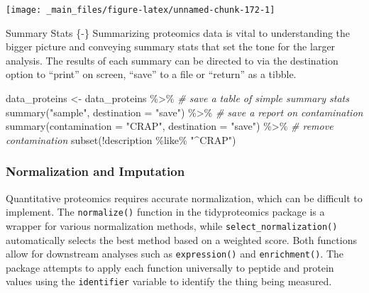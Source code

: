 \documentclass[
]{book}
\newenvironment{Shaded}{\begin{snugshade}}{\end{snugshade}}
\newcommand{\AttributeTok}[1]{\textcolor[rgb]{0.77,0.63,0.00}{#1}}
\newcommand{\CommentTok}[1]{\textcolor[rgb]{0.56,0.35,0.01}{\textit{#1}}}
\newcommand{\FunctionTok}[1]{\textcolor[rgb]{0.00,0.00,0.00}{#1}}
\newcommand{\NormalTok}[1]{#1}
\newcommand{\OtherTok}[1]{\textcolor[rgb]{0.56,0.35,0.01}{#1}}
\newcommand{\SpecialCharTok}[1]{\textcolor[rgb]{0.00,0.00,0.00}{#1}}
\newcommand{\StringTok}[1]{\textcolor[rgb]{0.31,0.60,0.02}{#1}}
\begin{document}
\begin{center}\texttt{[image: \_main\_files/figure-latex/unnamed-chunk-172-1]} \end{center}

Summary Stats \{-\}
Summarizing proteomics data is vital to understanding the bigger picture and conveying summary stats that set the tone for the larger analysis. The results of each summary can be directed to via the destination option to ``print'' on screen, ``save'' to a file or ``return'' as a tibble.

\begin{Shaded}
\begin{Highlighting}[]
\NormalTok{data\_proteins }\OtherTok{\textless{}{-}}\NormalTok{ data\_proteins }\SpecialCharTok{\%\textgreater{}\%}
  \CommentTok{\# save a table of simple summary stats}
  \FunctionTok{summary}\NormalTok{(}\StringTok{"sample"}\NormalTok{, }\AttributeTok{destination =} \StringTok{"save"}\NormalTok{) }\SpecialCharTok{\%\textgreater{}\%}
  \CommentTok{\# save a report on contamination}
  \FunctionTok{summary}\NormalTok{(}\AttributeTok{contamination =} \StringTok{"CRAP"}\NormalTok{, }\AttributeTok{destination =} \StringTok{"save"}\NormalTok{) }\SpecialCharTok{\%\textgreater{}\%}
  \CommentTok{\# remove contamination}
  \FunctionTok{subset}\NormalTok{(}\SpecialCharTok{!}\NormalTok{description }\SpecialCharTok{\%like\%} \StringTok{"\^{}CRAP"}\NormalTok{)}
\end{Highlighting}
\end{Shaded}

\hypertarget{normalization-and-imputation}{%
\subsubsection*{Normalization and Imputation}\label{normalization-and-imputation}}

Quantitative proteomics requires accurate normalization, which can be difficult to implement. The \texttt{normalize()} function in the tidyproteomics package is a wrapper for various normalization methods, while \texttt{select\_normalization()} automatically selects the best method based on a weighted score. Both functions allow for downstream analyses such as \texttt{expression()} and \texttt{enrichment()}. The package attempts to apply each function universally to peptide and protein values using the \texttt{identifier} variable to identify the thing being measured.
\end{document}
